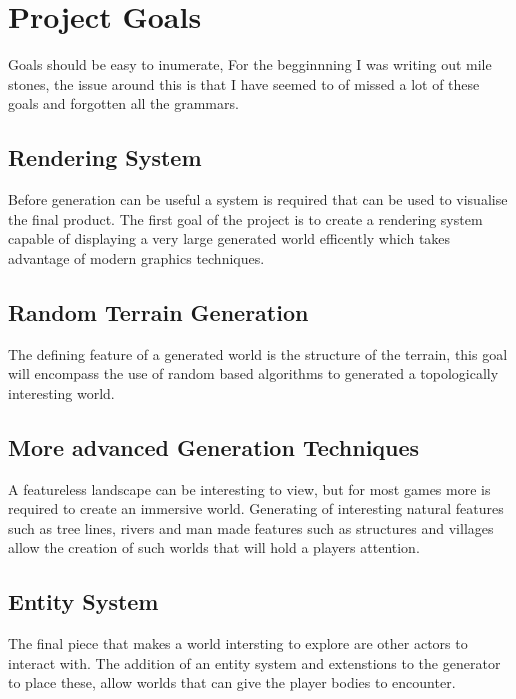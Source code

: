 \section{Project Goals}

Goals should be easy to inumerate, For the begginnning I was writing out mile
stones, the issue around this is that I have seemed to of missed a lot of these
goals and forgotten all the grammars.\\

\subsection{Rendering System}
Before generation can be useful a system is required that can be used to 
visualise the final product. The first goal of the project is to create a
rendering system capable of displaying a very large generated world efficently 
which takes advantage of modern graphics techniques.\\

\subsection{Random Terrain Generation}
The defining feature of a generated world is the structure of the terrain, this
goal will encompass the use of random based algorithms to generated a 
topologically interesting world.\\

\subsection{More advanced Generation Techniques}
A featureless landscape can be interesting to view, but for most games more is 
required to create an immersive world. Generating of interesting natural features
such as tree lines, rivers and man made features such as structures and villages
allow the creation of such worlds that will hold a players attention.

\subsection{Entity System}
The final piece that makes a world intersting to explore are other actors to 
interact with. The addition of an entity system and extenstions to the generator
to place these, allow worlds that can give the player bodies to encounter.\\
